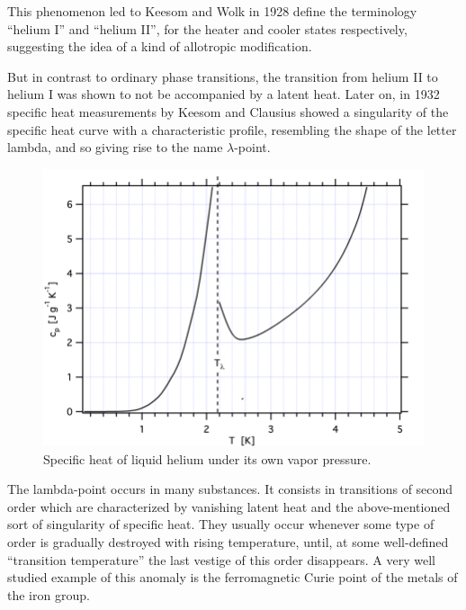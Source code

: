 \documentclass{article}
\begin{document}

This phenomenon led to Keesom and Wolk in 1928 define the terminology ``helium I'' and ``helium II'',
for the heater and cooler states respectively,
suggesting the idea of a kind of allotropic modification.

But in contrast to ordinary phase transitions, the transition from helium II to helium I was shown to not be accompanied by a latent heat. Later on, in 1932 specific heat measurements by Keesom and Clausius showed a singularity of the specific heat curve with a characteristic profile, resembling the shape of the letter lambda, and so giving rise to the name $\lambda$-point.
\\
\begin{figure}[H]
    \centering
    \includegraphics[width=0.62\linewidth]{Images/LambdaCp.png}
    \caption{Specific heat of liquid helium under its own vapor pressure.}
    \label{fig:enter-label}
\end{figure}

The lambda-point occurs in many substances. It consists in transitions of second order which are characterized by vanishing latent heat and the above-mentioned sort of singularity of specific heat. They usually occur whenever some type of order is gradually destroyed with rising temperature, until, at some well-defined ``transition temperature'' the last vestige of this order disappears. A very well studied example of this anomaly is the ferromagnetic Curie point of the metals of the iron group.
\\
\end{document}
